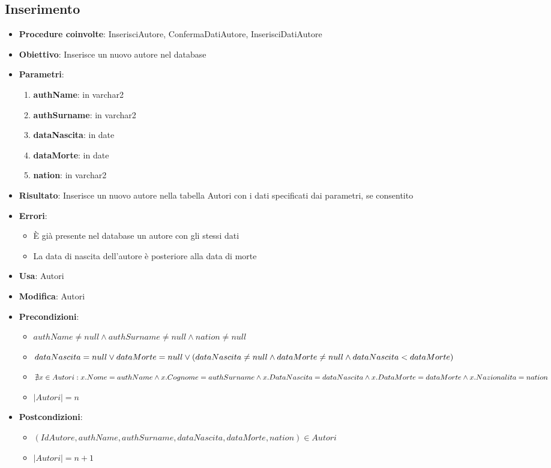 \subsection{Inserimento}
\begin{itemize}
	\item \textbf{Procedure coinvolte}: InserisciAutore, ConfermaDatiAutore, InserisciDatiAutore
	\item \textbf{Obiettivo}: Inserisce un nuovo autore nel database
	\item \textbf{Parametri}:
	\begin{enumerate}
		\item \textbf{authName}: in varchar2
		\item \textbf{authSurname}: in varchar2
		\item \textbf{dataNascita}: in date
		\item \textbf{dataMorte}: in date
		\item \textbf{nation}: in varchar2
	\end{enumerate}
	\item \textbf{Risultato}: Inserisce un nuovo autore nella tabella Autori con i dati specificati dai parametri, se consentito
	\item \textbf{Errori}: 
	\begin{itemize}
		\item È già presente nel database un autore con gli stessi dati
		\item La data di nascita dell'autore è posteriore alla data di morte
	\end{itemize}
	\item \textbf{Usa}: Autori
	\item \textbf{Modifica}: Autori
	\item \textbf{Precondizioni}:
	\begin{itemize}
		\item $authName \ne null \land authSurname \ne null \land nation \ne null$
		\item $dataNascita = null \\
		\lor dataMorte = null \\ 
		\lor (dataNascita \ne null \land dataMorte \ne null \land dataNascita < dataMorte)$
		\item $\nexists x \in Autori : x.Nome = authName \land x.Cognome = authSurname \\
		\land x.DataNascita = dataNascita \land x.DataMorte = dataMorte \\
		\land x.Nazionalita = nation$
		\item $|Autori| = n$
	\end{itemize}
	\item \textbf{Postcondizioni}:
	\begin{itemize}
		\item $(IdAutore,authName,authSurname,dataNascita,dataMorte,nation) \in Autori$
		\item $|Autori| = n + 1$
	\end{itemize}
\end{itemize}
